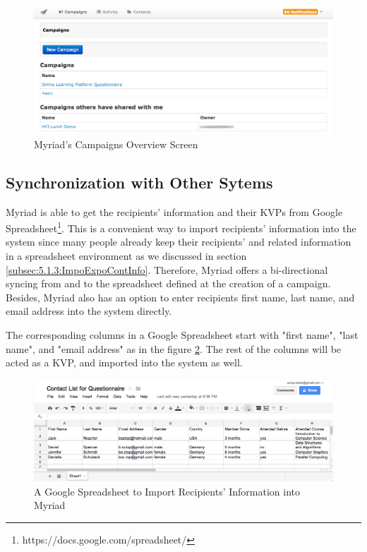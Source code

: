 \begin{figure}[htbp]
	\centering
	\includegraphics[width=1.00\textwidth]{imgs/CampaignsOverviewScreen.png}
	\caption[Myriad's Campaigns Overview Screen]{Myriad's Campaigns Overview Screen}
	\label{fig:CampaignsOverviewScreen}
\end{figure}

\subsection{Synchronization with Other Sytems}
\label{subsec:5.2.2:SyncOtheSyst}

Myriad is able to get the recipients' information and their \ac{KVP}s from Google Spreadsheet\footnote{https://docs.google.com/spreadsheet/}. This is a convenient way to import recipients' information into the system since many people already keep their recipients' and related information in a spreadsheet environment as we discussed in section \ref{subsec:5.1.3:ImpoExpoContInfo}. Therefore, Myriad offers a bi-directional syncing from and to the spreadsheet defined at the creation of a campaign. Besides, Myriad also has an option to enter recipients first name, last name, and email address into the system directly.
\vspace{1cm}

The corresponding columns in a Google Spreadsheet start with "first name", "last name", and "email address" as in the figure \ref{fig:GoogleSpreadsheet}. The rest of the columns will be acted as a \ac{KVP}, and imported into the system as well.

\begin{figure}[htbp]
	\centering
	\includegraphics[width=1.00\textwidth]{imgs/GoogleSpreadsheet.png}
	\caption[A Google Spreadsheet to Import Recipients' Information into Myriad]{A Google Spreadsheet to Import Recipients' Information into Myriad}
	\label{fig:GoogleSpreadsheet}
\end{figure}

